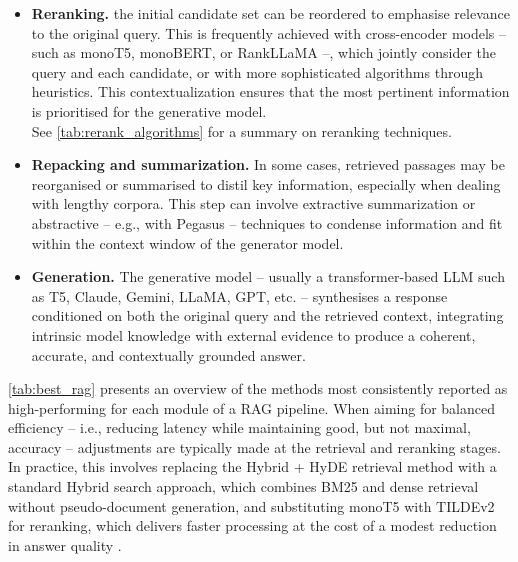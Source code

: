 \begin{spacing}{1.5}
\begin{itemize}
    \item \textbf{Reranking.} the initial candidate set can be reordered to emphasise relevance to the original query. This is frequently achieved with cross-encoder models -- such as monoT5, monoBERT, or RankLLaMA --, which jointly consider the query and each candidate, or with more sophisticated algorithms through heuristics. This contextualization ensures that the most pertinent information is prioritised for the generative model.\\See \autoref{tab:rerank_algorithms} for a summary on reranking techniques.
    \item \textbf{Repacking and summarization.} In some cases, retrieved passages may be reorganised or summarised to distil key information, especially when dealing with lengthy corpora. This step can involve extractive summarization or abstractive -- e.g., with Pegasus -- techniques to condense information and fit within the context window of the generator model.
    \item \textbf{Generation.} The generative model -- usually a transformer-based LLM such as T5, Claude, Gemini, LLaMA, GPT, etc. -- synthesises a response conditioned on both the original query and the retrieved context, integrating intrinsic model knowledge with external evidence to produce a coherent, accurate, and contextually grounded answer.
\end{itemize}


\autoref{tab:best_rag} presents an overview of the methods most consistently reported as high-performing for each module of a RAG pipeline. When aiming for balanced efficiency -- i.e., reducing latency while maintaining good, but not maximal, accuracy -- adjustments are typically made at the retrieval and reranking stages. In practice, this involves replacing the Hybrid + HyDE retrieval method with a standard Hybrid search approach, which combines BM25 and dense retrieval without pseudo-document generation, and substituting monoT5 with TILDEv2 for reranking, which delivers faster processing at the cost of a modest reduction in answer quality \citep{wang_searching_2024}.


\end{spacing}
